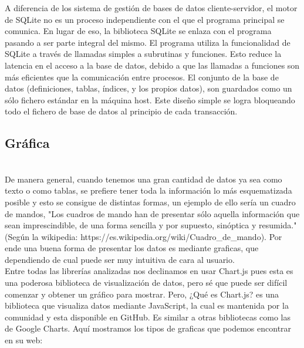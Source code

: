 \documentclass[a4paper, 11pt]{article}
\begin{document}
\begin{itemize}
            A diferencia de los sistema de gestión de bases de datos cliente-servidor,
            el motor de SQLite no es un proceso independiente con el que el programa
            principal se comunica. En lugar de eso, la biblioteca SQLite se enlaza con
            el programa pasando a ser parte integral del mismo. El programa utiliza la
            funcionalidad de SQLite a través de llamadas simples a subrutinas y
            funciones. Esto reduce la latencia en el acceso a la base de datos, debido
            a que las llamadas a funciones son más eficientes que la comunicación entre
            procesos. El conjunto de la base de datos (definiciones, tablas, índices,
            y los propios datos), son guardados como un sólo fichero estándar en la
            máquina host. Este diseño simple se logra bloqueando todo el fichero de
            base de datos al principio de cada transacción.

        \subsection{Gráfica}\\

          De manera general, cuando tenemos una gran cantidad de datos ya sea
          como texto o como tablas, se prefiere tener toda la información lo
          más esquematizada posible y esto se consigue de distintas formas, un
          ejemplo de ello sería un cuadro de mandos, "Los cuadros de mando han
          de presentar sólo aquella información que sean imprescindible, de una
          forma sencilla y por supuesto, sinóptica y resumida." (Según la
          wikipedia: https://es.wikipedia.org/wiki/Cuadro_de_mando). Por ende
          una buena forma de presentar los datos es mediante graficas, que
          dependiendo de cual puede ser muy intuitiva de cara al usuario.\\

          Entre todas las librerías analizadas nos declinamos en usar Chart.js
          pues esta es una poderosa biblioteca de visualización de datos, pero
          sé que puede ser difícil comenzar y obtener un gráfico para mostrar.
          Pero, ¿Qué es Chart.js? es una biblioteca que visualiza datos mediante
          JavaScript, la cual es mantenida por la comunidad y esta disponible
          en GitHub. Es similar a otras bibliotecas como las de Google Charts.
          Aquí mostramos los tipos de graficas que podemos encontrar en su web:\\


\end{itemize}
\end{document}

